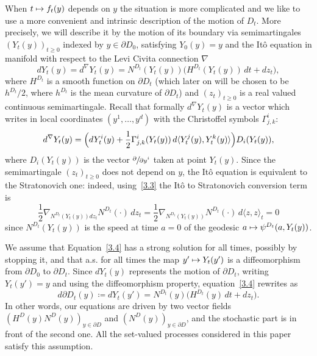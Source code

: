 \documentclass[JEP,XML,SOM,Unicode,NoFloatCountersInSection,published]{cedram}
\newcommand\mto{\mathchoice{\longmapsto}{\mapsto}{\mapsto}{\mapsto}}
\theoremstyle{plain}
\theoremstyle{definition}
\newcommand\df{\coloneqq}
\let\di\displaystyle
\let\f\frac
\let\n\nabla
\let\pa\partial
\begin{document}
When $t\mto f_t(y)$ depends on $y$ the situation is more complicated and we like to use a more convenient and intrinsic description of the motion of $D_t$. More precisely, we will describe it by the motion of its boundary via semimartingales $(Y_t(y))_{t\ge 0}$ indexed by $y\in \partial D_0$, satisfying $Y_0(y)=y$ and the Itô equation in manifold with respect to the Levi Civita connection $\n$
\begin{equation}
\label{3.4}
dY_t(y)=d^\n Y_t(y)=N^{D_t}(Y_t(y))\bigl(H^{D_t}(Y_t(y))\,dt +dz_t\bigr),
\end{equation}
where $H^{D_t}$ is a smooth function on $\partial D_t$ (which later on will be chosen to be $h^{D_t}/2$, where $h^{D_t}$ is the mean curvature of $\pa D_t$) and {$(z_t)_{t\geq 0}$} is a real valued continuous semimartingale.
Recall that formally $d^\n Y_t(y)$ is a vector which writes in local coordinates $(y^1,\ldots, y^d)$ with the Christoffel symbols $\Gamma_{j,k}^i$:
\begin{equation}
d^\n Y_t(y)=\Bigl(dY_t^i(y)+\f12 \Gamma_{j,k}^i(Y_t(y))\, d\langle Y_t^j(y),Y_t^k(y)\rangle \Bigr)D_i(Y_t(y)),
\end{equation}
where $D_i(Y_t(y))$ is the vector $\di \sfrac{\partial}{\partial y^i}$ taken at point $Y_t(y)$.
Since the semimartingale $(z_t)_{t\ge 0}$ does not depend on $y$, the Itô equation is equivalent to the Stratonovich one: indeed, using~\eqref{3.3} the Itô to Stratonovich conversion term is
\[
\f12\n_{N^{D_t}(Y_t(y))dz_t}N^{D_t}(\cdot)\,dz_t=\f12\n_{N^{D_t}(Y_t(y))}N^{D_t}(\cdot)\,d\langle z,z\rangle_t=0
\]
since $N^{D_t}(Y_t(y))$ is the speed at time $a=0$ of the geodesic $a\mto \psi^{D_t}(a,Y_t(y))$.
\par
We assume that Equation~\eqref{3.4} has a strong solution for all times, possibly by stopping it, and that a.s. for all times the map $y'\mto Y_t(y')$ is a diffeomorphism from $\partial D_0$ to $\partial D_t$.
Since $dY_t(y)$ represents the motion of $\partial D_t$, writing $Y_t(y')=y$ and using the diffeomorphism property, equation~\eqref{3.4} rewrites as
\begin{equation}
\label{3.6}
d\partial D_t(y){\df}dY_t(y')=N^{D_t}(y)\bigl(H^{D_t}(y)\, dt +dz_t\bigr).
\end{equation}
In other words, our equations are driven by two vector fields $(H^D(y)N^D(y))_{y\in \partial D}$ and $(N^D(y))_{y\in \partial D}$, and the stochastic part is in front of the second one. All the set-valued processes considered in this paper satisfy this assumption.
\end{document}
